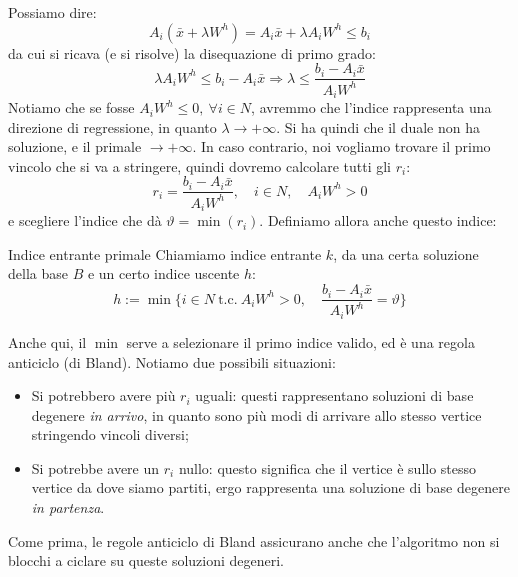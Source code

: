 \documentclass[a4paper,11pt]{article}
\begin{document}
\begin{itemize}
Possiamo dire:
$$
A_i \left( \bar{x} + \lambda W^h \right) = A_i \bar{x} + \lambda A_i W^h \leq b_i
$$
da cui si ricava (e si risolve) la disequazione di primo grado:
$$
\lambda A_i W^h \leq b_i - A_i \bar{x} \Rightarrow \lambda \leq \frac{b_i - A_i \bar{x}}{A_i W^h}
$$
Notiamo che se fosse $A_i W^h \leq 0, \ \forall i \in N$, avremmo che l'indice rappresenta una direzione di regressione, in quanto $\lambda \rightarrow +\infty$.
Si ha quindi che il duale non ha soluzione, e il primale $\rightarrow +\infty$.
In caso contrario, noi vogliamo trovare il primo vincolo che si va a stringere, quindi dovremo calcolare tutti gli $r_i$:
$$
r_i = \frac{b_i - A_i \bar{x}}{A_i W^h}, \quad i \in N, \quad A_i W^h > 0
$$
e scegliere l'indice che dà $\vartheta = \min(r_i)$.
Definiamo allora anche questo indice:
\begin{definition}{Indice entrante primale}
	Chiamiamo indice entrante $k$, da una certa soluzione della base $B$ e un certo indice uscente $h$:
	$$
	h := \min\{ i \in N \ \text{t.c.} \ A_i W^h > 0, \quad \frac{b_i - A_i \bar{x}}{A_i W^h} = \vartheta \}	
	$$
\end{definition}
Anche qui, il $\min$ serve a selezionare il primo indice valido, ed è una regola anticiclo (di Bland).
Notiamo due possibili situazioni:
\begin{itemize}
	\item Si potrebbero avere più $r_i$ uguali: questi rappresentano soluzioni di base degenere \textit{in arrivo}, in quanto sono più modi di arrivare allo stesso vertice stringendo vincoli diversi;
	\item Si potrebbe avere un $r_i$ nullo: questo significa che il vertice è sullo stesso vertice da dove siamo partiti, ergo rappresenta una soluzione di base degenere \textit{in partenza}.
\end{itemize}
Come prima, le regole anticiclo di Bland assicurano anche che l'algoritmo non si blocchi a ciclare su queste soluzioni degeneri.
\end{itemize}
\end{document}
